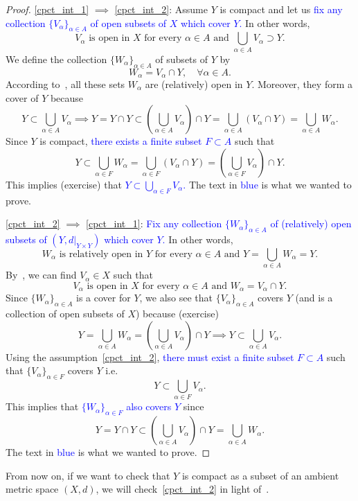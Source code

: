 \begin{proof}
\ref{cpct_int_1} $\implies$ \ref{cpct_int_2}: Assume $Y$ is compact and let us \textcolor{blue}{fix any collection $\{V_\alpha\}_{\alpha \in A}$ of open subsets of $X$ which cover $Y$.} In other words,
\[
V_\alpha\text{ is open in $X$ for every $\alpha \in A$ and }\bigcup_{\alpha \in A}V_\alpha \supset Y.
\]
We define the collection $\{W_\alpha\}_{\alpha \in A}$ of subsets of $Y$ by
\[
W_\alpha = V_\alpha \cap Y,\quad \forall \alpha \in A.
\]
According to~, all these sets $W_\alpha$ are (relatively) open in $Y$. Moreover, they form a cover of $Y$ because
\[
Y\subset \bigcup_{\alpha \in A}V_\alpha \implies Y = Y\cap Y \subset \left(\bigcup_{\alpha \in A}V_\alpha\right)\cap Y = \bigcup_{\alpha \in A} (V_\alpha \cap Y) = \bigcup_{\alpha \in A}W_\alpha.
\]
Since $Y$ is compact, \textcolor{blue}{there exists a finite subset $F\subset A$} such that
\[
Y\subset \bigcup_{\alpha \in F}W_\alpha = \bigcup_{\alpha \in F}(V_\alpha \cap Y) = \left(\bigcup_{\alpha \in F}V_\alpha\right)\cap Y.
\]
This implies (exercise) that \textcolor{blue}{$Y \subset \bigcup_{\alpha \in F}V_\alpha$.} The text in \textcolor{blue}{blue} is what we wanted to prove.

\ref{cpct_int_2} $\implies$ \ref{cpct_int_1}: \textcolor{blue}{Fix any collection $\{W_\alpha\}_{\alpha \in A}$ of (relatively) open subsets of $(Y,d|_{Y\times Y})$ which cover $Y$.} In other words,
\[
W_\alpha\text{ is relatively open in $Y$ for every $\alpha \in A$ and }Y = \bigcup_{\alpha \in A}W_\alpha = Y.
\]
By~, we can find $V_\alpha \in X$ such that
\[
V_\alpha \text{ is open in $X$ for every $\alpha \in A$ and }W_\alpha = V_\alpha \cap Y.
\]
Since $\{W_\alpha\}_{\alpha \in A}$ is a cover for $Y$, we also see that $\{V_\alpha\}_{\alpha \in A}$ covers $Y$ (and is a collection of open subsets of $X$) because (exercise)
\[
Y = \bigcup_{\alpha \in A}W_\alpha = \left(\bigcup_{\alpha \in A}V_\alpha\right)\cap Y \implies Y \subset \bigcup_{\alpha \in A}V_\alpha.
\]
Using the assumption~\ref{cpct_int_2}, \textcolor{blue}{there must exist a finite subset $F\subset A$} such that $\{V_\alpha\}_{\alpha \in F}$ covers $Y$ i.e.
\[
Y \subset \bigcup_{\alpha \in F}V_\alpha.
\]
This implies that \textcolor{blue}{$\{W_\alpha\}_{\alpha \in F}$ also covers $Y$} since
\[
Y = Y\cap Y \subset \left(\bigcup_{\alpha \in A}V_\alpha\right)\cap Y = \bigcup_{\alpha \in A}W_\alpha.
\]
The text in \textcolor{blue}{blue} is what we wanted to prove.
\end{proof}
From now on, if we want to check that $Y$ is compact as a subset of an ambient metric space $(X,d)$, we will check~\ref{cpct_int_2} in light of~.
